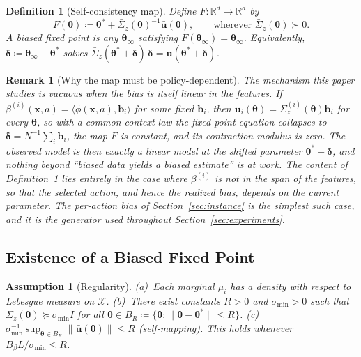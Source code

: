 \documentclass[11pt]{article}
\newtheorem{definition}[theorem]{Definition}
\newtheorem{assumption}[theorem]{Assumption}
\newtheorem{remark}[theorem]{Remark}
\begin{document}
\begin{definition}[Self-consistency map]\label{def:F}
Define $F:\mathbb{R}^d\to\mathbb{R}^d$ by
\[
F(\bm{\theta})\coloneqq\bm{\theta}^{\!*}+\bar{\Sigma}_z(\bm{\theta})^{-1}\bar{\bm{u}}(\bm{\theta}),
\qquad\text{wherever }\bar{\Sigma}_z(\bm{\theta})\succ 0.
\]
A \emph{biased fixed point} is any $\bm{\theta}_\infty$ satisfying
$F(\bm{\theta}_\infty)=\bm{\theta}_\infty$. Equivalently,
$\bm{\delta}\coloneqq\bm{\theta}_\infty-\bm{\theta}^{\!*}$ solves
$\bar{\Sigma}_z(\bm{\theta}^{\!*}+\bm{\delta})\,\bm{\delta}
=\bar{\bm{u}}(\bm{\theta}^{\!*}+\bm{\delta})$.
\end{definition}

\begin{remark}[Why the map must be policy-dependent]\label{rem:nonlinear}
The mechanism this paper studies is vacuous when the bias is itself
linear in the features. If $\beta^{(i)}(\bm x,a)
=\langle\phi(\bm x,a),\bm b_i\rangle$ for some fixed $\bm b_i$, then
$\bm u_i(\bm\theta)=\Sigma_z^{(i)}(\bm\theta)\bm b_i$ for
\emph{every} $\bm\theta$, so with a common context law the fixed-point
equation collapses to $\bm\delta=N^{-1}\sum_i\bm b_i$, the map $F$ is
constant, and its contraction modulus is zero.  The observed model is
then exactly a linear model at the shifted parameter
$\bm\theta^{\!*}+\bm\delta$, and nothing beyond ``biased data yields a
biased estimate'' is at work.  The content of Definition~\ref{def:F}
lies entirely in the case where $\beta^{(i)}$ is \emph{not} in the
span of the features, so that the selected action, and hence the
realized bias, depends on the current parameter.  The
per-action bias of Section~\ref{sec:instance} is the simplest such
case, and it is the generator used throughout
Section~\ref{sec:experiments}.
\end{remark}

\subsection{Existence of a Biased Fixed Point}

\begin{assumption}[Regularity]\label{ass:reg}
(a)~Each marginal $\mu_i$ has a density with respect to Lebesgue
measure on $\mathcal{X}$.
(b)~There exist constants $R>0$ and $\sigma_{\min}>0$ such that
$\bar{\Sigma}_z(\bm{\theta})\succeq\sigma_{\min}I$ for all
$\bm{\theta}\in B_R\coloneqq\{\bm{\theta}:\|\bm{\theta}-\bm{\theta}^{\!*}\|\leq R\}$.
(c)~$\sigma_{\min}^{-1}\sup_{\bm{\theta}\in B_R}\|\bar{\bm{u}}(\bm{\theta})\|\leq R$
(self-mapping). This holds whenever $B_\beta L/\sigma_{\min}\leq R$.
\end{assumption}
\end{document}
